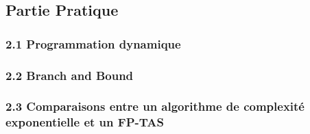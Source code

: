 \documentclass{article}
\begin{document}
\begin{enumerate}
On déduit donc que $\frac{31}{3}= \frac{11}{3} x_{2} + x_{3} - \frac{2}{3} x_{4}$, d'où $\frac{11}{3} x_{2} - \frac[2}{3}x_{4} \geq \frac{1}{3} $.
\end{enumerate}
\subsection*{Partie Pratique}

\subsubsection*{2.1 Programmation dynamique}

\subsubsection*{2.2 Branch and Bound}

\subsubsection*{2.3 Comparaisons entre un algorithme de complexité exponentielle et un FP-TAS}
\end{document}

